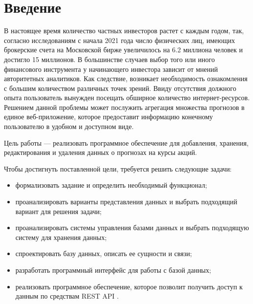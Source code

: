 \chapter*{Введение}

В настоящее время количество частных инвесторов растет с каждым годом, так, согласно исследованиям \cite{moex} с начала 2021 года число физических лиц, имеющих брокерские счета на Московской бирже увеличилось на 6.2 миллиона человек и достигло 15 миллионов. В большинстве случаев выбор того или иного финансового инструмента у начинающего инвестора зависит от мнений авторитетных аналитиков. Как следствие, возникает необходимость ознакомления с большим количеством различных точек зрений. Ввиду отсутствия должного опыта пользователь вынужден посещать обширное количество интернет-ресурсов. Решением данной проблемы может послужить агрегация множества прогнозов в единое веб-приложение, которое предоставит информацию конечному пользователю в удобном и доступном виде.

Цель работы --- реализовать программное обеспечение для добавления, хранения, редактирования и удаления данных о прогнозах на курсы акций.

Чтобы достигнуть поставленной цели, требуется решить следующие задачи:

\begin{itemize}
    \item формализовать задание и определить необходимый функционал;
    \item проанализировать варианты представления данных и выбрать подходящий вариант для решения задачи;
    \item проанализировать системы управления базами данных и выбрать подходящую систему для хранения данных;
    \item спроектировать базу данных, описать ее сущности и связи;
    \item разработать программный интерфейс для работы с базой данных;
    \item реализовать программное обеспечение, которое позволит получить доступ к данным по средствам REST API \cite{rest-api}.
\end{itemize}
